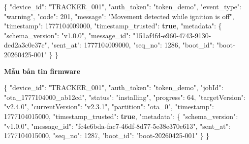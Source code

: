 \documentclass[a4paper]{extarticle}
\newenvironment{Shaded}{}{}
\newcommand{\DataTypeTok}[1]{\textcolor[rgb]{0.56,0.13,0.00}{#1}}
\newcommand{\DecValTok}[1]{\textcolor[rgb]{0.25,0.63,0.44}{#1}}
\newcommand{\FunctionTok}[1]{\textcolor[rgb]{0.02,0.16,0.49}{#1}}
\newcommand{\KeywordTok}[1]{\textcolor[rgb]{0.00,0.44,0.13}{\textbf{#1}}}
\newcommand{\StringTok}[1]{\textcolor[rgb]{0.25,0.44,0.63}{#1}}
\newcommand{\thesisterm}[1]{{\rmfamily #1}}
\begin{document}
\begin{Shaded}
\begin{Highlighting}[]
\FunctionTok{\{}
  \DataTypeTok{"device\_id"}\FunctionTok{:} \StringTok{"TRACKER\_001"}\FunctionTok{,}
  \DataTypeTok{"auth\_token"}\FunctionTok{:} \StringTok{"token\_demo"}\FunctionTok{,}
  \DataTypeTok{"event\_type"}\FunctionTok{:} \StringTok{"warning"}\FunctionTok{,}
  \DataTypeTok{"code"}\FunctionTok{:} \DecValTok{201}\FunctionTok{,}
  \DataTypeTok{"message"}\FunctionTok{:} \StringTok{"Movement detected while ignition is off"}\FunctionTok{,}
  \DataTypeTok{"timestamp"}\FunctionTok{:} \DecValTok{1777104009000}\FunctionTok{,}
  \DataTypeTok{"timestamp\_trusted"}\FunctionTok{:} \KeywordTok{true}\FunctionTok{,}
  \DataTypeTok{"metadata"}\FunctionTok{:} \FunctionTok{\{}
    \DataTypeTok{"schema\_version"}\FunctionTok{:} \StringTok{"v1.0.0"}\FunctionTok{,}
    \DataTypeTok{"message\_id"}\FunctionTok{:} \StringTok{"151af4fd{-}e960{-}4743{-}9130{-}ded2a3c0e37c"}\FunctionTok{,}
    \DataTypeTok{"sent\_at"}\FunctionTok{:} \DecValTok{1777104009000}\FunctionTok{,}
    \DataTypeTok{"seq\_no"}\FunctionTok{:} \DecValTok{1286}\FunctionTok{,}
    \DataTypeTok{"boot\_id"}\FunctionTok{:} \StringTok{"boot{-}20260425{-}001"}
  \FunctionTok{\}}
\FunctionTok{\}}
\end{Highlighting}
\end{Shaded}

\textbf{Mẫu bản tin \thesisterm{firmware}}

\begin{Shaded}
\begin{Highlighting}[]
\FunctionTok{\{}
  \DataTypeTok{"device\_id"}\FunctionTok{:} \StringTok{"TRACKER\_001"}\FunctionTok{,}
  \DataTypeTok{"auth\_token"}\FunctionTok{:} \StringTok{"token\_demo"}\FunctionTok{,}
  \DataTypeTok{"jobId"}\FunctionTok{:} \StringTok{"ota\_1777104000\_ab12cd"}\FunctionTok{,}
  \DataTypeTok{"status"}\FunctionTok{:} \StringTok{"installing"}\FunctionTok{,}
  \DataTypeTok{"progress"}\FunctionTok{:} \DecValTok{64}\FunctionTok{,}
  \DataTypeTok{"targetVersion"}\FunctionTok{:} \StringTok{"v2.4.0"}\FunctionTok{,}
  \DataTypeTok{"currentVersion"}\FunctionTok{:} \StringTok{"v2.3.1"}\FunctionTok{,}
  \DataTypeTok{"partition"}\FunctionTok{:} \StringTok{"ota\_0"}\FunctionTok{,}
  \DataTypeTok{"timestamp"}\FunctionTok{:} \DecValTok{1777104015000}\FunctionTok{,}
  \DataTypeTok{"timestamp\_trusted"}\FunctionTok{:} \KeywordTok{true}\FunctionTok{,}
  \DataTypeTok{"metadata"}\FunctionTok{:} \FunctionTok{\{}
    \DataTypeTok{"schema\_version"}\FunctionTok{:} \StringTok{"v1.0.0"}\FunctionTok{,}
    \DataTypeTok{"message\_id"}\FunctionTok{:} \StringTok{"fc4e6bda{-}fac7{-}46df{-}8d77{-}5e38e370e613"}\FunctionTok{,}
    \DataTypeTok{"sent\_at"}\FunctionTok{:} \DecValTok{1777104015000}\FunctionTok{,}
    \DataTypeTok{"seq\_no"}\FunctionTok{:} \DecValTok{1287}\FunctionTok{,}
    \DataTypeTok{"boot\_id"}\FunctionTok{:} \StringTok{"boot{-}20260425{-}001"}
  \FunctionTok{\}}
\FunctionTok{\}}
\end{Highlighting}
\end{Shaded}
\end{document}
